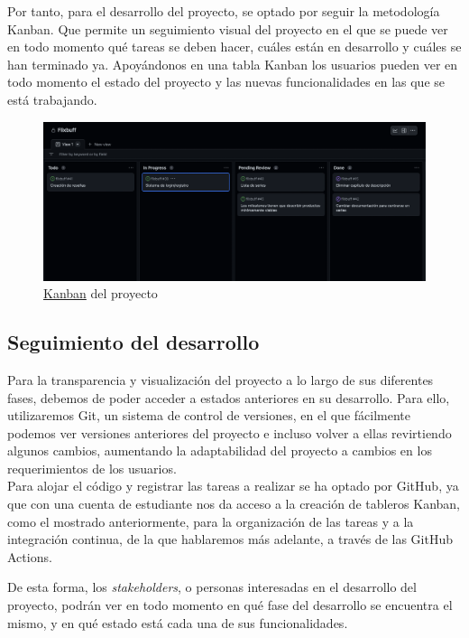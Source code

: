 Por tanto, para el desarrollo del proyecto, se optado por seguir la metodología Kanban. Que permite un seguimiento
visual del proyecto en el que se puede ver en todo momento qué tareas se deben hacer, cuáles están en desarrollo y
cuáles se han terminado ya. Apoyándonos en una tabla Kanban los usuarios pueden ver en todo momento el estado del
proyecto y las nuevas funcionalidades en las que se está trabajando. \\
\begin{figure}[H]
	\centering	
	\includegraphics[scale=0.25]{img/kanban.png}
	\caption{\href{https://github.com/users/Torchu/projects/2}{Kanban} del proyecto}\label{fig:kanban_table}
\end{figure}

\subsection{Seguimiento del desarrollo}
Para la transparencia y visualización del proyecto a lo largo de sus diferentes fases, debemos de poder acceder a
estados anteriores en su desarrollo. Para ello, utilizaremos Git, un sistema de control de versiones, en el que
fácilmente podemos ver versiones anteriores del proyecto e incluso volver a ellas revirtiendo algunos cambios,
aumentando la adaptabilidad del proyecto a cambios en los requerimientos de los usuarios.\\

Para alojar el código y registrar las tareas a realizar se ha optado por GitHub, ya que con una cuenta de estudiante
nos da acceso a la creación de tableros Kanban, como el mostrado anteriormente, para la organización de las tareas y a
la integración continua, de la que hablaremos más adelante, a través de las GitHub Actions.

De esta forma, los \textit{stakeholders}, o personas interesadas en el desarrollo del proyecto, podrán ver en todo
momento en qué fase del desarrollo se encuentra el mismo, y en qué estado está cada una de sus funcionalidades.\\

